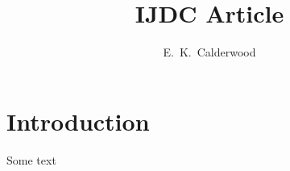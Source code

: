 \documentclass[paper]{ijdc-v9}
\title{IJDC Article}
\author{E.\ K.\ Calderwood}
\affil{Bantshire University}
\begin{document}
\maketitle

\section{Introduction}
Some text~\cite{apa6ed}



\end{document}
